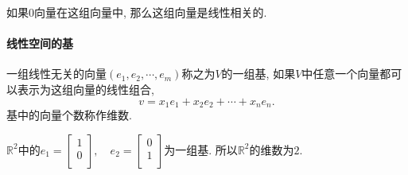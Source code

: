 \begin{example}
    如果$0$向量在这组向量中, 那么这组向量是线性相关的.
\end{example}

\paragraph{线性空间的基}
\begin{definition}
    一组线性无关的向量$(e_1,e_2, \cdots , e_m)$称之为$V$的一组基, 如果$V$中任意一个向量都可以表示为这组向量的线性组合,
    \begin{equation}
      v = x_1e_1+x_2e_2+ \cdots  + x_n e_n.
    \end{equation}
    基中的向量个数称作维数.
\end{definition}

\begin{example}
    $\mathbb{R}^{2}$中的$e_1 = \begin{bmatrix}
     1\\
     0\\
    \end{bmatrix}, \quad e_2 = \begin{bmatrix}
     0\\
     1\\
    \end{bmatrix}$为一组基. 所以$\mathbb{R}^{2}$的维数为$2$.
\end{example}

